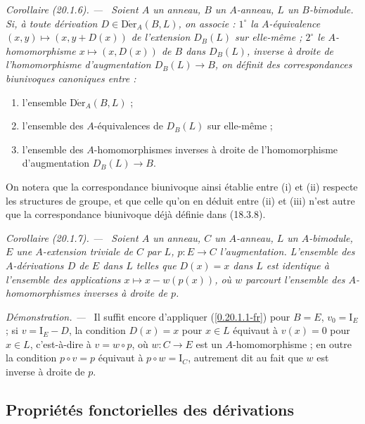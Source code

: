 \documentclass[10pt,oneside]{book}
\makeatletter
\newcommand{\sref}[1]{(\ref{#1})}
\newcommand{\setmanualcurrentlabel}[1]{\def\@currentlabel{#1}}
\newenvironment{corollary}[1][]{%
  \setmanualcurrentlabel{#1}\par\medskip\noindent\itshape Corollaire (#1). ---\ }{\par}
\newenvironment{proof}{%
  \par\medskip\noindent\textit{Démonstration. ---\ }}{\par}
\makeatother
\begin{document}
\begin{corollary}[20.1.6]
\label{0.20.1.6-fr}
Soient $A$ un anneau, $B$ un $A$-anneau, $L$ un $B$-bimodule. Si, à toute
dérivation $D\in\operatorname{D\acute{e}r}_A(B,L)$, on associe : $1^\circ$ la
$A$-équivalence $(x,y)\mapsto(x,y+D(x))$ de l'extension $D_B(L)$ sur
elle-même ; $2^\circ$ le $A$-homomorphisme $x\mapsto(x,D(x))$ de $B$ dans
$D_B(L)$, inverse à droite de l'homomorphisme d'augmentation $D_B(L)\to B$,
on définit des correspondances biunivoques canoniques entre :
\begin{enumerate}
  \item[\rm(i)] l'ensemble $\operatorname{D\acute{e}r}_A(B,L)$ ;
  \item[\rm(ii)] l'ensemble des $A$-équivalences de $D_B(L)$ sur elle-même ;
  \item[\rm(iii)] l'ensemble des $A$-homomorphismes inverses à droite de
  l'homomorphisme d'augmentation $D_B(L)\to B$.
\end{enumerate}
\end{corollary}

On notera que la correspondance biunivoque ainsi établie entre (i) et (ii)
respecte les structures de groupe, et que celle qu'on en déduit entre (ii) et
(iii) n'est autre que la correspondance biunivoque déjà définie dans (18.3.8).

\begin{corollary}[20.1.7]
\label{0.20.1.7-fr}
Soient $A$ un anneau, $C$ un $A$-anneau, $L$ un $A$-bimodule, $E$ une
$A$-extension triviale de $C$ par $L$, $p:E\to C$ l'augmentation. L'ensemble
des $A$-dérivations $D$ de $E$ dans $L$ telles que $D(x)=x$ dans $L$ est
identique à l'ensemble des applications $x\mapsto x-w(p(x))$, où $w$
parcourt l'ensemble des $A$-homomorphismes inverses à droite de $p$.
\end{corollary}

\begin{proof}
Il suffit encore d'appliquer \sref{0.20.1.1-fr} pour $B=E$,
$v_0=\mathrm{I}_E$ ; si $v=\mathrm{I}_E-D$, la condition $D(x)=x$ pour
$x\in L$ équivaut à $v(x)=0$ pour $x\in L$, c'est-à-dire à $v=w\circ p$,
où $w:C\to E$ est un $A$-homomorphisme ; en outre la condition
$p\circ v=p$ équivaut à $p\circ w=\mathrm{I}_C$, autrement dit au fait que
$w$ est inverse à droite de $p$.
\end{proof}

\subsection{Propriétés fonctorielles des dérivations}
\label{subsection:0.20.2-fr}
\end{document}
